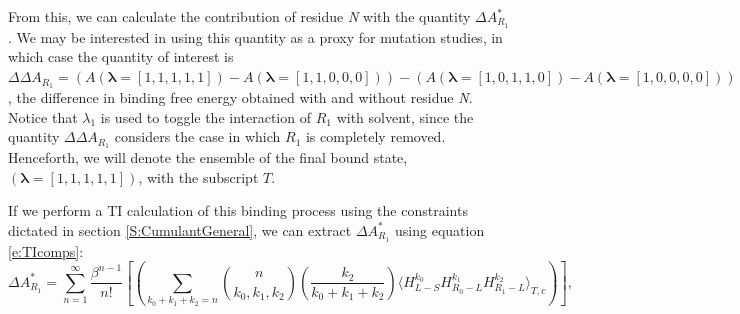 \documentclass[%
 preprint,
 amsmath,amssymb,
 aps,
]{revtex4-1}
\renewcommand{\vec}[1]{{\mathbf{#1}}}
\begin{document}
 From this, we can calculate the contribution of residue \emph{N} with the quantity $\Delta A^*_{R_1}$.  
 We may be interested in using this quantity as a proxy for mutation studies, in which case the quantity of interest is 
 $\Delta \Delta A_{R_1} = \left( A\left(\vec{\lambda}=\left[1,1,1,1,1\right] \right) - A\left(\vec{\lambda}=\left[1,1,0,0,0\right] \right) \right) -
 \left( A\left(\vec{\lambda}=\left[1,0,1,1,0\right] \right)- A\left(\vec{\lambda}=\left[1,0,0,0,0\right] \right)\right) $, 
 the difference in binding free energy obtained with and without residue \emph{N}.  Notice that $\lambda_1$ is used to toggle the interaction of $R_1$ with solvent, since the quantity  $\Delta \Delta A_{R_1}$ considers the case in which $R_1$ is completely removed.  Henceforth, we will denote the ensemble of the final bound state, $\left(\vec{\lambda}=\left[1,1,1,1,1\right] \right)$, with the subscript $T$. 
 
If we perform a TI calculation of this binding process using the constraints dictated in section \ref{S:CumulantGeneral}, we can extract $\Delta A^*_{R_1}$ using equation \ref{e:TIcomps}:
 \begin{equation}
\Delta A^*_ {R_1}=
\sum_{n=1}^{\infty}  \frac{\beta^{n-1}}{n!} 
\left[
\left(
 \sum_{k_0+k_1+k_2=n} 
{ n \choose k_0,k_1,k_2 } \left( \frac{k_2}{k_0+k_1+k_2} \right) \langle  H_{L-S}^{k_0} H_{R_0-L}^{k_1} H_{R_1-L}^{k_2} 
\rangle_{T,c}
\right)
\right],
\label{e:BradyDecomp:CBR}
\end{equation}
 
\end{document}

